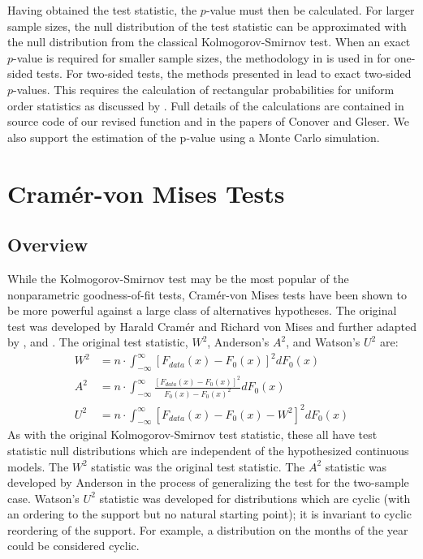 Having obtained the test statistic, the $p$-value must then be calculated. 
For larger sample sizes, the null distribution
of the test statistic can be approximated
with the null distribution from the classical Kolmogorov-Smirnov test. 
When an exact $p$-value is required for
smaller sample sizes, the methodology in \citet{Conover1972} is used in
for one-sided tests.  For two-sided tests, the methods presented in
\citet{gleser85} lead to exact two-sided $p$-values.  This requires the
calculation of rectangular probabilities for uniform order statistics
as discussed by \citet{nieder81}.
Full details of the calculations are contained in source code
of our revised function  and in the papers of
Conover and Gleser.  We also support the estimation of the p-value
using a Monte Carlo simulation.

\section{Cram\'{e}r-von Mises Tests}

\subsection{Overview}

While the Kolmogorov-Smirnov test may be the most popular of
the nonparametric goodness-of-fit tests, Cram\'{e}r-von Mises
tests have been shown to be more powerful against a large class
of alternatives hypotheses. 
The original test was developed by
Harald Cram\'{e}r and Richard von Mises \citep{cramer1928, vonmises1928} 
and further adapted by \cite{anderson1952}, and  \cite{Watson1961}. 
The original test statistic, $W^2$, Anderson's $A^2$, and Watson's
$U^2$ are:
\begin{align}
W^2 &= n \cdot \int_{-\infty}^{\infty} \left[ F_{data}(x)- F_{0}(x) \right]^2 dF_0(x) \label{W2} \\
A^2 &= n \cdot \int_{-\infty}^{\infty} \frac{\left[F_{data}(x)- F_{0}(x) \right]^2}{F_0(x) -F_0(x)^2} dF_0(x) \label{A2} \\
U^2 &= n \cdot \int_{-\infty}^{\infty} \left[ F_{data}(x)- F_{0}(x) - W^2 \right]^2 dF_0(x) \label{U2}
\end{align}
As with the original Kolmogorov-Smirnov test statistic, these all have 
test statistic null distributions which are independent of the
hypothesized continuous models.
The $W^2$ statistic was the original test statistic.
The $A^2$ statistic was developed by
Anderson in the process of generalizing the test for the two-sample case.
Watson's $U^2$ statistic was developed for distributions
which are cyclic (with an ordering to the support but
no natural starting point); it is invariant to cyclic reordering of
the support.   For example, a distribution on the months of the year
could be considered cyclic.


